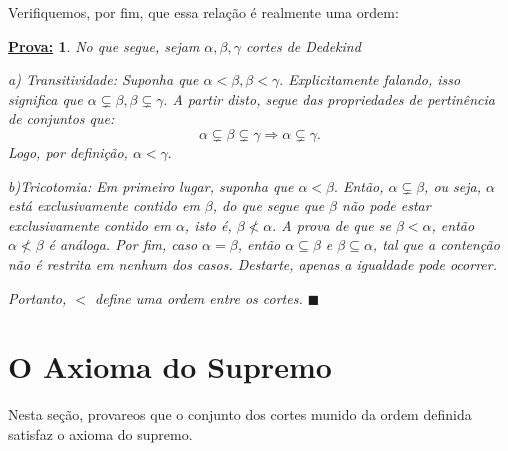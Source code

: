 \documentclass{article}
\newtheorem*{proof*}{\underline{Prova:}}
\renewcommand\qedsymbol{$\blacksquare$}
\begin{document}
Verifiquemos, por fim, que essa rela\c c\~ao \'e realmente uma ordem:
\begin{proof*} No que segue, sejam $\alpha, \beta, \gamma$ cortes de Dedekind

a) Transitividade: Suponha que $\alpha < \beta, \beta < \gamma.$ Explicitamente falando, isso significa que $\alpha\subsetneq\beta, \beta\subsetneq\gamma.$ A partir disto, segue das propriedades de pertin\^encia de conjuntos que:
$$
	\alpha\subsetneq\beta\subsetneq\gamma \Rightarrow \alpha\subsetneq\gamma.
$$
Logo, por defini\c c\~ao, $\alpha < \gamma.$

b)Tricotomia: Em primeiro lugar, suponha que $\alpha < \beta.$ Ent\~ao, $\alpha\subsetneq\beta$, ou seja, $\alpha$ est\'a exclusivamente contido em $\beta$, do que segue que $\beta$ n\~ao pode estar exclusivamente contido em $\alpha$, isto \'e, $\beta \nless \alpha.$ A prova de que se $\beta < \alpha$, ent\~ao $\alpha \nless \beta$ \'e an\'aloga. Por fim, caso $\alpha = \beta$, ent\~ao $\alpha\subseteq\beta$ e $\beta\subseteq\alpha$, tal que a conten\c c\~ao n\~ao \'e restrita em nenhum dos casos. Destarte, apenas a igualdade pode ocorrer.

Portanto, $<$ define uma ordem entre os cortes.
\qedsymbol
\end{proof*}

\section{O Axioma do Supremo}
Nesta se\c c\~ao, provareos que o conjunto dos cortes munido da ordem definida satisfaz o axioma do supremo.
\end{document}

